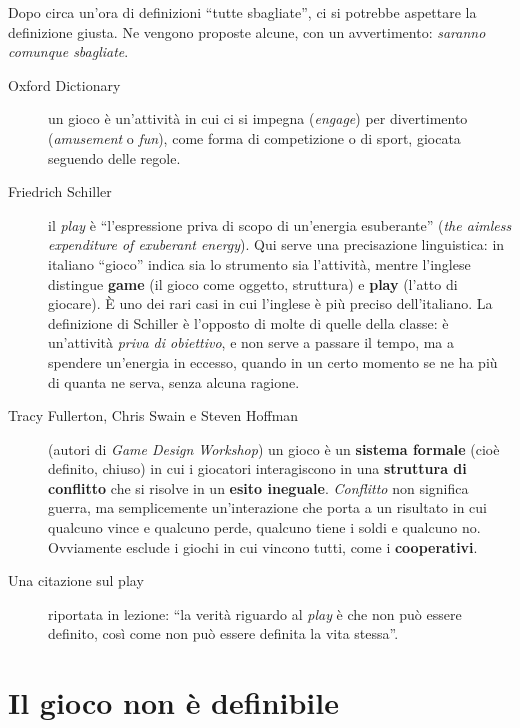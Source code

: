 Dopo circa un'ora di definizioni ``tutte sbagliate'', ci si potrebbe aspettare
la definizione giusta. Ne vengono proposte alcune, con un avvertimento:
\emph{saranno comunque sbagliate}.

\begin{description}
  \item[Oxford Dictionary] un gioco è un'attività in cui ci si impegna
        (\emph{engage}) per divertimento (\emph{amusement} o \emph{fun}), come
        forma di competizione o di sport, giocata seguendo delle regole.
  \item[Friedrich Schiller] il \emph{play} è ``l'espressione priva di scopo
        di un'energia esuberante'' (\emph{the aimless expenditure of
        exuberant energy}). Qui serve una precisazione linguistica: in
        italiano ``gioco'' indica sia lo strumento sia l'attività, mentre
        l'inglese distingue \textbf{game} (il gioco come oggetto, struttura) e
        \textbf{play} (l'atto di giocare). È uno dei rari casi in cui l'inglese
        è più preciso dell'italiano. La definizione di Schiller è l'opposto di
        molte di quelle della classe: è un'attività \emph{priva di obiettivo},
        e non serve a passare il tempo, ma a spendere un'energia in eccesso,
        quando in un certo momento se ne ha più di quanta ne serva, senza
        alcuna ragione.
  \item[Tracy Fullerton, Chris Swain e Steven Hoffman] (autori di \emph{Game
        Design Workshop}) un gioco è un \textbf{sistema formale} (cioè
        definito, chiuso) in cui i giocatori interagiscono in una
        \textbf{struttura di conflitto} che si risolve in un \textbf{esito
        ineguale}. \emph{Conflitto} non significa guerra, ma semplicemente
        un'interazione che porta a un risultato in cui qualcuno vince e
        qualcuno perde, qualcuno tiene i soldi e qualcuno no. Ovviamente
        esclude i giochi in cui vincono tutti, come i \textbf{cooperativi}.
  \item[Una citazione sul play] riportata in lezione: ``la verità riguardo al
        \emph{play} è che non può essere definito, così come non può essere
        definita la vita stessa''.
\end{description}

\section{Il gioco non è definibile}
\label{sec:non-definibile}


